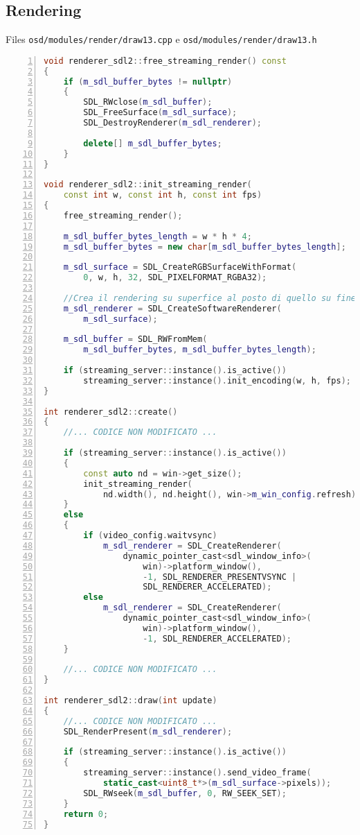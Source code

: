 \subsection{Rendering}
Files \verb|osd/modules/render/draw13.cpp| e \verb|osd/modules/render/draw13.h|

\begin{lstlisting}[language=C++, numbers=left, tabsize=4]
void renderer_sdl2::free_streaming_render() const
{
	if (m_sdl_buffer_bytes != nullptr)
	{
		SDL_RWclose(m_sdl_buffer);
		SDL_FreeSurface(m_sdl_surface);
		SDL_DestroyRenderer(m_sdl_renderer);

		delete[] m_sdl_buffer_bytes;
	}
}

void renderer_sdl2::init_streaming_render(
	const int w, const int h, const int fps)
{
	free_streaming_render();

	m_sdl_buffer_bytes_length = w * h * 4;
	m_sdl_buffer_bytes = new char[m_sdl_buffer_bytes_length];

	m_sdl_surface = SDL_CreateRGBSurfaceWithFormat(
		0, w, h, 32, SDL_PIXELFORMAT_RGBA32);

	//Crea il rendering su superfice al posto di quello su finestra
	m_sdl_renderer = SDL_CreateSoftwareRenderer(
		m_sdl_surface);

	m_sdl_buffer = SDL_RWFromMem(
		m_sdl_buffer_bytes, m_sdl_buffer_bytes_length);

	if (streaming_server::instance().is_active())
		streaming_server::instance().init_encoding(w, h, fps);
}

int renderer_sdl2::create()
{
	//... CODICE NON MODIFICATO ...

	if (streaming_server::instance().is_active())
	{
		const auto nd = win->get_size();
		init_streaming_render(
			nd.width(), nd.height(), win->m_win_config.refresh);
	}
	else
	{
		if (video_config.waitvsync)
			m_sdl_renderer = SDL_CreateRenderer(
				dynamic_pointer_cast<sdl_window_info>(
					win)->platform_window(), 
					-1, SDL_RENDERER_PRESENTVSYNC | 
					SDL_RENDERER_ACCELERATED);
		else
			m_sdl_renderer = SDL_CreateRenderer(
				dynamic_pointer_cast<sdl_window_info>(
					win)->platform_window(), 
					-1, SDL_RENDERER_ACCELERATED);
	}

	//... CODICE NON MODIFICATO ...
}

int renderer_sdl2::draw(int update)
{
	//... CODICE NON MODIFICATO ...
	SDL_RenderPresent(m_sdl_renderer);	

	if (streaming_server::instance().is_active())
	{
		streaming_server::instance().send_video_frame(
			static_cast<uint8_t*>(m_sdl_surface->pixels));
		SDL_RWseek(m_sdl_buffer, 0, RW_SEEK_SET);
	}
	return 0;
}
\end{lstlisting}

